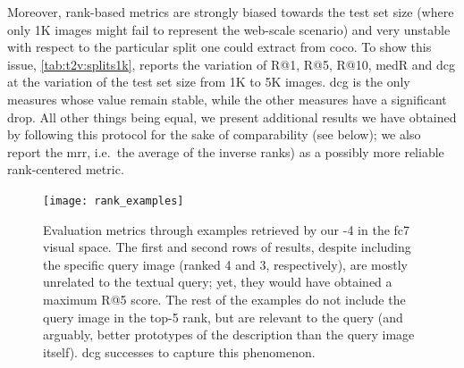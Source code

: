 Moreover, rank-based metrics are strongly biased towards the test set size (where only 1K images might fail to represent the web-scale scenario) and very unstable with respect to the particular split one could extract from \gls{coco}.
To show this issue, \ref{tab:t2v:splits1k}, reports the variation of R@1, R@5, R@10, \gls{medR} and \gls{dcg} at the variation of the test set size from 1K to 5K images.
\gls{dcg} is the only measures whose value remain stable, while the other measures have a significant drop.
All other things being equal, we present additional results we have obtained by following this protocol for the sake of comparability (see below);
we also report the \acrfull{mrr}, i.e.\ the average of the inverse ranks) as a possibly more reliable rank-centered metric.

\begin{figure}
 \texttt{[image: rank\_examples]}
 \caption{Evaluation metrics through examples retrieved by our \widedeepttv{}-4 in the fc7 visual space.
The first and second rows of results, despite including the specific query image (ranked 4 and 3, respectively), are mostly unrelated to the textual query;
 yet, they would have obtained a maximum R@5 score.
 The rest of the examples do not include the query image in the top-5 rank, but are relevant to the query (and arguably, better prototypes of the description than the query image itself).
 \gls{dcg} successes to capture this phenomenon.}
 \label{fig:t2v:metrics}
\end{figure}


